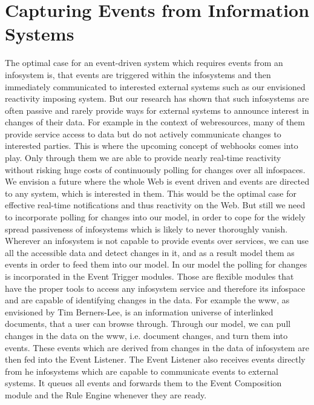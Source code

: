 \section{Capturing Events from Information Systems}
The optimal case for an event-driven system which requires events from an \textrm{\gls{infosystem}} is, that events are triggered within the \textrm{\glspl{infosystem}} and then immediately communicated to interested external systems such as our envisioned reactivity imposing system.
But our research has shown that such \textrm{\glspl{infosystem}} are often passive and rarely provide ways for external systems to announce interest in changes of their data.
For example in the context of \textrm{\glspl{webresource}}, many of them provide service access to data but do not actively communicate changes to interested parties.
This is where the upcoming concept of \textrm{\glspl{webhook}} comes into play.
Only through them we are able to provide nearly real-time reactivity without risking huge costs of continuously polling for changes over all \textrm{\glspl{infospace}}.
We envision a future where the whole Web is event driven and events are directed to any system, which is interested in them.
This would be the optimal case for effective real-time notifications and thus reactivity on the Web.
But still we need to incorporate polling for changes into our model, in order to cope for the widely spread passiveness of \textrm{\glspl{infosystem}} which is likely to never thoroughly vanish.
Wherever an \textrm{\gls{infosystem}} is not capable to provide events over services, we can use all the accessible data and detect changes in it, and as a result model them as events in order to feed them into our model.
In our model the polling for changes is incorporated in the \textrm{Event Trigger} modules.
Those are flexible modules that have the proper tools to access any \textrm{\gls{infosystem}} service and therefore its \textrm{\gls{infospace}} and are capable of identifying changes in the data.
For example the \textrm{\gls{www}}, as envisioned by Tim Berners-Lee\cite{DBLP:journals/en/Berners-LeeCGP92}, is an information universe of interlinked documents, that a user can browse through.
Through our model, we can pull changes in the data on the \textrm{\gls{www}}, i.e. document changes, and turn them into events.
These events which are derived from changes in the data of \textrm{\gls{infosystem}} are then fed into the \textrm{Event Listener}.
The \textrm{Event Listener} also receives events directly from he \textrm{\glspl{infosystem}} which are capable to communicate events to external systems.
It queues all events and forwards them to the \textrm{Event Composition} module and the \textrm{Rule Engine} whenever they are ready.



